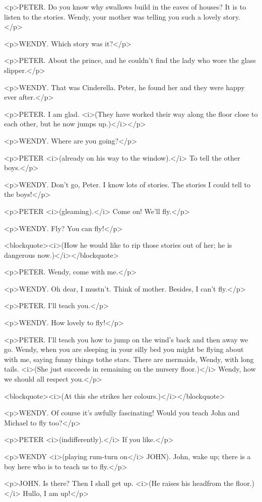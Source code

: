 <p>PETER. Do you know why swallows build in the eaves of houses? It
is to listen to the stories. Wendy, your mother was telling you such
a lovely story.</p>

<p>WENDY. Which story was it?</p>

<p>PETER. About the prince, and he couldn't find the lady who wore
the glass slipper.</p>

<p>WENDY. That was Cinderella. Peter, he found her and they were
happy ever after.</p>

<p>PETER. I am glad. <i>(They have worked their way along the floor
close to each other, but he now jumps up.)</i></p>

<p>WENDY. Where are you going?</p>

<p>PETER <i>(already on his way to the window).</i> To tell the other
boys.</p>

<p>WENDY. Don't go, Peter. I know lots of stories. The stories I
could tell to the boys!</p>

<p>PETER <i>(gleaming).</i> Come on! We'll fly.</p>

<p>WENDY. Fly? You can fly!</p>

<blockquote><i>(How he would like to rip those stories out of her; he
is dangerous now.)</i></blockquote>

<p>PETER. Wendy, come with me.</p>

<p>WENDY. Oh dear, I mustn't. Think of mother. Besides, I can't
fly.</p>

<p>PETER. I'll teach you.</p>

<p>WENDY. How lovely to fly!</p>

<p>PETER. I'll teach you how to jump on the wind's back and then away
we go. Wendy, when you are sleeping in your silly bed you might be
flying about with me, saying funny things tothe stars. There are
mermaids, Wendy, with long tails. <i>(She just succeeds in remaining
on the nursery floor.)</i> Wendy, how we should all respect you.</p>

<blockquote><i>(At this she strikes her colours.)</i></blockquote>

<p>WENDY. Of course it's awfully fascinating! Would you teach John
and Michael to fly too?</p>

<p>PETER <i>(indifferently).</i> If you like.</p>

<p>WENDY <i>(playing rum-turn on</i> JOHN). John, wake up; there is a
boy here who is to teach us to fly.</p>

<p>JOHN. Is there? Then I shall get up. <i>(He raises his headfrom
the floor.)</i> Hullo, I am up!</p>

